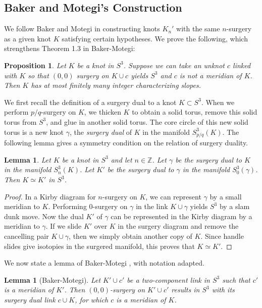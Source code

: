 \documentclass[11pt,usenames,dvipsnames,reqno]{amsart}
\numberwithin{theorem}{section}
\newtheorem{lemma}[theorem]{Lemma}
\newtheorem{proposition}[theorem]{Proposition}
\theoremstyle{ex}
\theoremstyle{rem}
\begin{document}
\subsection{Baker and Motegi's Construction} We follow Baker and Motegi \cite{baker-motegi} in constructing knots $K_n'$ with the same $n$-surgery as a given knot $K$ satisfying certain hypotheses. We prove the following, which strengthens Theorem 1.3 in Baker-Motegi:

\begin{proposition}\label{prop 2.3}
	Let $K$ be a knot in $S^3$. Suppose we can take an unknot $c$ linked with $K$ so that $(0,0)$ surgery on $K\cup c$ yields $S^3$ and $c$ is not a meridian of $K$. Then $K$ has at most finitely many integer characterizing slopes.
\end{proposition}

We first recall the definition of a surgery dual to a knot $K\subset S^3$. When we perform $p/q$-surgery on $K$, we thicken $K$ to obtain a solid torus, remove this solid torus from $S^3$, and glue in another solid torus. The core circle of this new solid torus is a new knot $\gamma$, the \textit{surgery dual} of $K$ in the manifold $S^3_{p/q}(K)$. The following lemma gives a symmetry condition on the relation of surgery duality.

\begin{lemma}
	Let $K$ be a knot in $S^3$ and let $n\in\mathbb{Z}$. Let $\gamma$ be the surgery dual to $K$ in the manifold $S^3_n(K)$. Let $K'$ be the surgery dual to $\gamma$ in the manifold $S^3_0(\gamma)$. Then $K\simeq K'$ in $S^3$.
\end{lemma}

\begin{proof}
	In a Kirby diagram for $n$-surgery on $K$, we can represent $\gamma$ by a small meridian to $K$. Performing $0$-surgery on $\gamma$ in the link $K\cup\gamma$ yields $S^3$ by a slam dunk move. Now the dual $K'$ of $\gamma$ can be represented in the Kirby diagram by a meridian to $\gamma$. If we slide $K'$ over $K$ in the surgery diagram and remove the cancelling pair $K\cup \gamma$, then we simply obtain another copy of $K$. Since handle slides give isotopies in the surgered manifold, this proves that $K\simeq K'$.
\end{proof}

We now state a lemma of Baker-Motegi \cite[Lemma 2.4]{baker-motegi}, with notation adapted.

\begin{lemma}[Baker-Motegi]
	Let $K'\cup c'$ be a two-component link in $S^3$ such that $c'$ is a meridian of $K'$. Then $(0,0)$-surgery on $K'\cup c'$ results in $S^3$ with its surgery dual link $c\cup K$, for which $c$ is a meridian of $K$.
\end{lemma}
\end{document}
